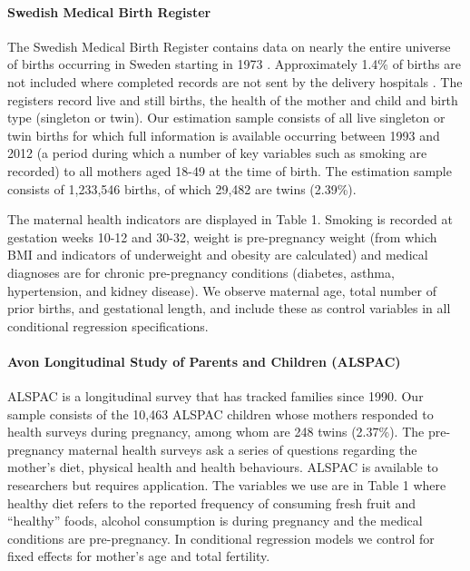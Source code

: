 \documentclass[12pt]{article}
\begin{document}
\paragraph{Swedish Medical Birth Register}
The Swedish Medical Birth Register contains data on nearly the entire universe of births occurring in Sweden starting in 1973 \cite{EPC2003}.  Approximately 1.4\% of births are not included where completed records are not sent by the delivery hospitals \cite{EPC2003}. The registers record live and still births, the health of the mother and child and birth type (singleton or twin).  Our estimation sample consists of all live singleton or twin births for which full information is available occurring between 1993 and 2012 (a period during which a number of key variables such as smoking are recorded) to all mothers aged 18-49 at the time of birth.  The estimation sample consists of 1,233,546 births, of which 29,482 are twins (2.39\%). 

The maternal health indicators are displayed in Table 1. Smoking is recorded at gestation weeks 10-12 and 30-32, weight is pre-pregnancy weight (from which BMI and indicators of underweight and obesity are calculated) and medical diagnoses are for chronic pre-pregnancy conditions (diabetes, asthma, hypertension, and kidney disease). We observe maternal age, total number of prior births, and gestational length, and include these as control variables in all conditional regression specifications.

\paragraph{Avon Longitudinal Study of Parents and Children (ALSPAC)}
ALSPAC is a longitudinal survey that has tracked families since 1990. Our sample consists of the 10,463 ALSPAC children whose mothers responded to health surveys during pregnancy, among whom are 248 twins (2.37\%). The pre-pregnancy maternal health surveys ask a series of questions regarding the mother's diet, physical health and health behaviours. ALSPAC is available to researchers but requires application. The variables we use are in Table 1 where healthy diet refers to the reported frequency of consuming fresh fruit and ``healthy'' foods, alcohol consumption is during pregnancy and the medical conditions are pre-pregnancy. In conditional regression models we control for fixed effects for mother's age and total fertility.
\end{document}
